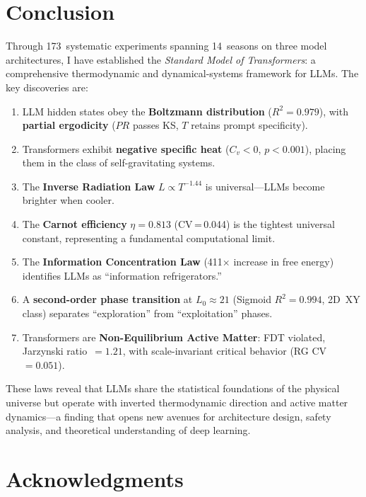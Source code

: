 \documentclass[11pt,a4paper]{article}
\begin{document}
\section{Conclusion}

Through 173~systematic experiments spanning 14~seasons on three model architectures, I have established the \textit{Standard Model of Transformers}: a comprehensive thermodynamic and dynamical-systems framework for LLMs. The key discoveries are:

\begin{enumerate}
    \item LLM hidden states obey the \textbf{Boltzmann distribution} ($R^2 = 0.979$), with \textbf{partial ergodicity} ($PR$ passes KS, $T$ retains prompt specificity).
    \item Transformers exhibit \textbf{negative specific heat} ($C_v < 0$, $p < 0.001$), placing them in the class of self-gravitating systems.
    \item The \textbf{Inverse Radiation Law} $L \propto T^{-1.44}$ is universal---LLMs become brighter when cooler.
    \item The \textbf{Carnot efficiency} $\eta = 0.813$ (CV\,=\,0.044) is the tightest universal constant, representing a fundamental computational limit.
    \item The \textbf{Information Concentration Law} (411$\times$ increase in free energy) identifies LLMs as ``information refrigerators.''
    \item A \textbf{second-order phase transition} at $L_0 \approx 21$ (Sigmoid $R^2 = 0.994$, 2D~XY class) separates ``exploration'' from ``exploitation'' phases.
    \item Transformers are \textbf{Non-Equilibrium Active Matter}: FDT violated, Jarzynski ratio~$= 1.21$, with scale-invariant critical behavior (RG CV~$= 0.051$).
\end{enumerate}

These laws reveal that LLMs share the statistical foundations of the physical universe but operate with inverted thermodynamic direction and active matter dynamics---a finding that opens new avenues for architecture design, safety analysis, and theoretical understanding of deep learning.

\section*{Acknowledgments}
\end{document}
